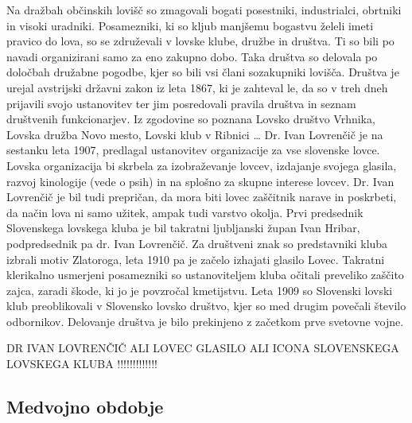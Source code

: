 \documentclass[a4paper,12pt,openright]{book}
\begin{document}
Na dražbah občinskih lovišč so zmagovali bogati posestniki, industrialci, obrtniki in visoki uradniki. 
Posamezniki, ki so kljub manjšemu bogastvu želeli imeti pravico do lova, so se združevali v lovske klube, družbe in društva. 
Ti so bili po navadi organizirani samo za eno zakupno dobo. 
Taka društva so delovala po določbah družabne pogodbe, kjer so bili vsi člani sozakupniki lovišča. 
Društva je urejal avstrijski državni zakon iz leta 1867, ki je zahteval le, da so v treh dneh prijavili svojo ustanovitev ter jim posredovali pravila društva in seznam društvenih funkcionarjev. 
Iz zgodovine so poznana Lovsko društvo Vrhnika, Lovska družba Novo mesto, Lovski klub v Ribnici …
Dr. Ivan Lovrenčič je na sestanku leta 1907, predlagal ustanovitev organizacije za vse slovenske lovce. 
Lovska organizacija bi skrbela za izobraževanje lovcev, izdajanje svojega glasila, razvoj kinologije (vede o psih) in na splošno za skupne interese lovcev. 
Dr. Ivan Lovrenčič je bil tudi prepričan, da mora biti lovec zaščitnik narave in poskrbeti, da način lova ni samo užitek, ampak tudi varstvo okolja. 
Prvi predsednik Slovenskega lovskega kluba je bil takratni ljubljanski župan Ivan Hribar, podpredsednik pa dr. Ivan Lovrenčič. 
Za društveni znak so predstavniki kluba izbrali motiv Zlatoroga, leta 1910 pa je začelo izhajati glasilo Lovec. 
Takratni klerikalno usmerjeni posamezniki so ustanoviteljem kluba očitali preveliko zaščito zajca, zaradi škode, ki jo je povzročal kmetijstvu. 
Leta 1909 so Slovenski lovski klub preoblikovali v Slovensko lovsko društvo, kjer so med drugim povečali število odbornikov. 
Delovanje društva je bilo prekinjeno z začetkom prve svetovne vojne.\cite{Lov_65_85}

DR IVAN LOVRENČIČ ALI LOVEC GLASILO ALI ICONA SLOVENSKEGA LOVSKEGA KLUBA !!!!!!!!!!!!!

\subsection{Medvojno obdobje}
\end{document}
